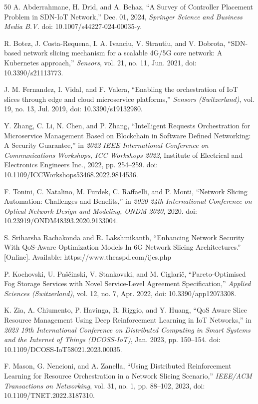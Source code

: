 \documentclass[conference]{IEEEtran}
\begin{document}
\begin{thebibliography}{50}
 A. Abderrahmane, H. Drid, and A. Behaz, ``A Survey of Controller Placement Problem in SDN-IoT Network,'' Dec. 01, 2024, \emph{Springer Science and Business Media B.V.} doi: 10.1007/s44227-024-00035-y.

 R. Botez, J. Costa-Requena, I. A. Ivanciu, V. Strautiu, and V. Dobrota, ``SDN-based network slicing mechanism for a scalable 4G/5G core network: A Kubernetes approach,'' \emph{Sensors}, vol. 21, no. 11, Jun. 2021, doi: 10.3390/s21113773.

 J. M. Fernandez, I. Vidal, and F. Valera, ``Enabling the orchestration of IoT slices through edge and cloud microservice platforms,'' \emph{Sensors (Switzerland)}, vol. 19, no. 13, Jul. 2019, doi: 10.3390/s19132980.

 Y. Zhang, C. Li, N. Chen, and P. Zhang, ``Intelligent Requests Orchestration for Microservice Management Based on Blockchain in Software Defined Networking: A Security Guarantee,'' in \emph{2022 IEEE International Conference on Communications Workshops, ICC Workshops 2022}, Institute of Electrical and Electronics Engineers Inc., 2022, pp. 254--259. doi: 10.1109/ICCWorkshops53468.2022.9814536.

 F. Tonini, C. Natalino, M. Furdek, C. Raffaelli, and P. Monti, ``Network Slicing Automation: Challenges and Benefits,'' in \emph{2020 24th International Conference on Optical Network Design and Modeling, ONDM 2020}, 2020. doi: 10.23919/ONDM48393.2020.9133004.

 S. Sriharsha Rachakonda and R. Lakshmikanth, ``Enhancing Network Security With QoS-Aware Optimization Models In 6G Network Slicing Architectures.'' {[}Online{]}. Available: https://www.theaspd.com/ijes.php

 P. Kochovski, U. Paščinski, V. Stankovski, and M. Ciglarič, ``Pareto-Optimised Fog Storage Services with Novel Service-Level Agreement Specification,'' \emph{Applied Sciences (Switzerland)}, vol. 12, no. 7, Apr. 2022, doi: 10.3390/app12073308.

 K. Zia, A. Chiumento, P. Havinga, R. Riggio, and Y. Huang, ``QoS Aware Slice Resource Management Using Deep Reinforcement Learning in IoT Networks,'' in \emph{2023 19th International Conference on Distributed Computing in Smart Systems and the Internet of Things (DCOSS-IoT)}, Jan. 2023, pp. 150--154. doi: 10.1109/DCOSS-IoT58021.2023.00035.

 F. Mason, G. Nencioni, and A. Zanella, ``Using Distributed Reinforcement Learning for Resource Orchestration in a Network Slicing Scenario,'' \emph{IEEE/ACM Transactions on Networking}, vol. 31, no. 1, pp. 88--102, 2023, doi: 10.1109/TNET.2022.3187310.


\end{thebibliography}
\end{document}
